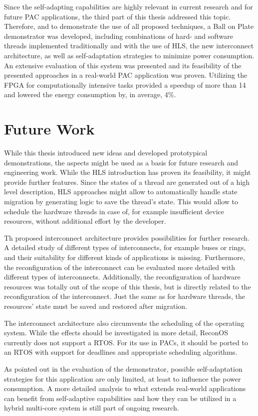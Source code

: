 Since the self-adapting capabilities are highly relevant in current research
and for future \ac{PAC} applications, the third part of this thesis addressed
this topic. Therefore, and to demonstrate the use of all proposed techniques,
a Ball on Plate demonstrator was developed, including combinations of hard-
and software threads implemented traditionally and with the use of
\ac{HLS}, the new interconnect architecture, as well as self-adaptation
strategies to minimize power consumption. An extensive evaluation of this
system was presented and its feasibility of the presented approaches in a
real-world \ac{PAC} application was proven. Utilizing the \ac{FPGA} for computationally intensive tasks provided a speedup of more than 14 and lowered the energy consumption by, in average, 4\%.

\section{Future Work}
While this thesis introduced new ideas and developed prototypical
demonstrations, the aspects might be used as a basis for future research and
engineering work. While the \ac{HLS} introduction has proven its feasibility,
it might provide further features. Since the states of a thread are generated
out of a high level description, \ac{HLS} approaches might allow to
automatically handle state migration by generating logic to save the thread's
state. This would allow to schedule the hardware threads in case of, for
example insufficient device resources, without additional effort by the
developer.

Th proposed interconnect architecture provides possibilities for further
research. A detailed study of different types of interconnects, for example
buses or rings, and their suitability for different kinds of applications is
missing. Furthermore, the reconfiguration of the interconnect can be
evaluated more detailed with different types of interconnects. Additionally,
the reconfiguration of hardware resources was totally out of the scope of this
thesis, but is directly related to the reconfiguration of the interconnect.
Just the same as for hardware threads, the resources' state must be saved and
restored after migration.

The interconnect architecture also circumvents the scheduling of the operating
system. While the effects should be investigated in more detail, ReconOS
currently does not support a \ac{RTOS}. For its use in \acp{PAC}, it should be
ported to an \ac{RTOS} with support for deadlines and appropriate scheduling
algorithms.

As pointed out in the evaluation of the demonstrator, possible self-adaptation
strategies for this application are only limited, at least to influence the
power consumption. A more detailed analysis to what extends real-world
applications can benefit from self-adaptive capabilities and how they can be
utilized in a hybrid multi-core system is still part of ongoing research.